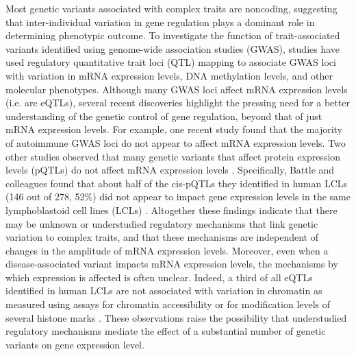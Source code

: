 Most genetic variants associated with complex traits are noncoding, suggesting that inter-individual variation in gene regulation plays a dominant role in determining phenotypic outcome. To investigate the function of trait-associated variants identified using genome-wide association studies (GWAS), studies have used regulatory quantitative trait loci (QTL) mapping to associate GWAS loci with variation in mRNA expression levels, DNA methylation levels, and other molecular phenotypes. Although many GWAS loci affect mRNA expression levels (i.e. are eQTLs), several recent discoveries highlight the pressing need for a better understanding of the genetic control of gene regulation, beyond that of just mRNA expression levels. For example, one recent study \citep{chun_limited_2017} found that the majority of autoimmune GWAS loci do not appear to affect mRNA expression levels. Two other studies observed that many genetic variants that affect protein expression levels (pQTLs) do not affect mRNA expression levels \citep{battle_genomic_2015, chick_defining_2016}. Specifically, Battle and colleagues found that about half of the cis-pQTLs they identified in human LCLs (146 out of 278, 52\%) did not appear to impact gene expression levels in the same lymphoblastoid cell lines (LCLs) \citep{battle_genomic_2015}. Altogether these findings indicate that there may be unknown or understudied regulatory mechanisms that link genetic variation to complex traits, and that these mechanisms are independent of changes in the amplitude of mRNA expression levels. Moreover, even when a disease-associated variant impacts mRNA expression levels, the mechanisms by which expression is affected is often unclear. Indeed, a third of all eQTLs identified in human LCLs are not associated with variation in chromatin as measured using assays for chromatin accessibility or for modification levels of several histone marks \citep{li_rna_2016}. These observations raise the possibility that understudied regulatory mechanisms mediate the effect of a substantial number of genetic variants on gene expression level.


